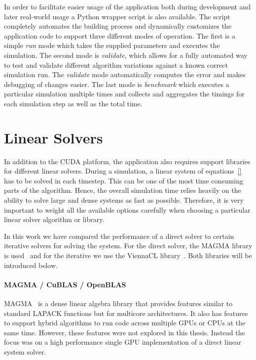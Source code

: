 In order to facilitate easier usage of the application both during development and later real-world usage a Python wrapper script is also available. The script completely automates the building process and dynamically customizes the application code to support three different modes of operation. The first is a simple \emph{run} mode which takes the supplied parameters and executes the simulation. The second mode is \emph{validate}, which allows for a fully automated way to test and validate different algorithm variations against a known correct simulation run. The \emph{validate} mode automatically computes the error and makes debugging of changes easier. The last mode is \emph{benchmark} which executes a particular simulation multiple times and collects and aggregates the timings for each simulation step as well as the total time.

\section{Linear Solvers}
In addition to the CUDA platform, the application also requires support libraries for different linear solvers. During a simulation, a linear system of equations~\eqref{} has to be solved in each timestep. This can be one of the most time consuming parts of the algorithm. Hence, the overall simulation time relies heavily on the ability to solve large and dense systems as fast as possible. Therefore, it is very important to weight all the available options carefully when choosing a particular linear solver algorithm or library.

In this work we have compared the performance of a direct solver to certain iterative solvers for solving the system. For the direct solver, the MAGMA library is used~\cite{MagmaDocumentation} and for the iterative we use the ViennaCL library~\cite{ViennaCLDocumentation}. Both libraries will be introduced below.

\paragraph{MAGMA / CuBLAS / OpenBLAS}
MAGMA~\cite{MagmaDocumentation} is a dense linear algebra library that provides features similar to standard LAPACK functions but for multicore architectures. It also has features to support hybrid algorithms to run code across multiple GPUs or CPUs at the same time. However, these features were not explored in this thesis. Instead the focus was on a high performance single GPU implementation of a direct linear system solver.

